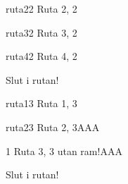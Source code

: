 \documentclass[portrait]{KTHEEposter}
\begin{document}
\begin{rutor}{3}
  \begin{ruta}[4]{1}{ruta22}
    Ruta 2, 2
  \end{ruta}

  \begin{ruta}[4]{0.5}{ruta32}
    Ruta 3, 2
  \end{ruta}

  \begin{ruta}[4]{1.5}{ruta42}
    Ruta 4, 2
    \vfill
    
    Slut i rutan!

  \end{ruta}


  \begin{ruta}[3]{1}{ruta13}
    Ruta 1, 3
  \end{ruta}
  
  \begin{ruta}[3]{1}{ruta23}
    Ruta 2, 3\hfill AAA
  \end{ruta}

  \begin{ruta_utan_ram}[3]{1}
    Ruta 3, 3 utan ram!\hfill AAA \\
    \vfill
    
    Slut i rutan!
  \end{ruta_utan_ram}

%
%
%
%
%
%
%
%
\end{rutor}
\end{document}
